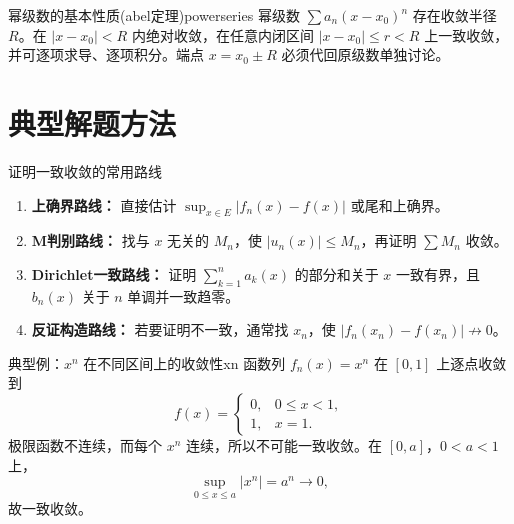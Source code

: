 \documentclass[UTF8,zihao=-4,openany]{ctexbook}
\begin{document}
\begin{theorem}{幂级数的基本性质(abel定理)}{powerseries}
幂级数 $\sum a_n(x-x_0)^n$ 存在收敛半径 $R$。在 $|x-x_0|<R$ 内绝对收敛，在任意内闭区间 $|x-x_0|\le r<R$ 上一致收敛，并可逐项求导、逐项积分。端点 $x=x_0\pm R$ 必须代回原级数单独讨论。
\end{theorem}

\section{典型解题方法}
\begin{methodbox}{证明一致收敛的常用路线}
\begin{enumerate}
\item \textbf{上确界路线：} 直接估计 $\sup_{x\in E}|f_n(x)-f(x)|$ 或尾和上确界。
\item \textbf{M判别路线：} 找与 $x$ 无关的 $M_n$，使 $|u_n(x)|\le M_n$，再证明 $\sum M_n$ 收敛。
\item \textbf{Dirichlet一致路线：} 证明 $\sum_{k=1}^{n}a_k(x)$ 的部分和关于 $x$ 一致有界，且 $b_n(x)$ 关于 $n$ 单调并一致趋零。
\item \textbf{反证构造路线：} 若要证明不一致，通常找 $x_n$，使 $|f_n(x_n)-f(x_n)|\not\to0$。
\end{enumerate}
\end{methodbox}

\begin{example}{典型例：$x^n$ 在不同区间上的收敛性}{xn}
函数列 $f_n(x)=x^n$ 在 $[0,1]$ 上逐点收敛到
\[
f(x)=\begin{cases}0,&0\le x<1,\\1,&x=1.
\end{cases}
\]
极限函数不连续，而每个 $x^n$ 连续，所以不可能一致收敛。在 $[0,a]$，$0<a<1$ 上，
\[
\sup_{0\le x\le a}|x^n|=a^n\to0,
\]
故一致收敛。
\end{example}
\end{document}

